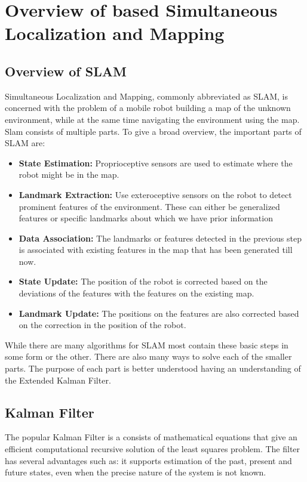\chapter{Overview of \ekf based Simultaneous Localization and Mapping}
\label{cha:Overview}
\section{Overview of SLAM}
\label{sec:SLAM_parts}
Simultaneous Localization and Mapping, commonly abbreviated as SLAM, is concerned with the problem of a mobile robot building a map of the unknown environment, while at the same time navigating the environment using the map. Slam consists of multiple parts. To give a broad overview, the important parts of SLAM are: 
	\begin{itemize}
		\item \textbf{State Estimation:} Proprioceptive sensors are used to estimate where the robot might be in the map.
		\item \textbf{Landmark Extraction:} Use exteroceptive sensors on the robot to detect prominent features of the environment. These can either be generalized features or specific landmarks about which we have prior information 
		\item \textbf{Data Association:} The landmarks or features detected in the previous step is associated with existing features in the map that has been generated till now.  
		\item \textbf{State Update:} The position of the robot is corrected based on the deviations of the features with the features on the existing map. 
		\item \textbf{Landmark Update:} The positions on the features are also corrected based on the correction in the position of the robot. 
	\end{itemize}

While there are many algorithms for SLAM most contain these basic steps in some form or the other. There are also many ways to solve each of the smaller parts. The purpose of each part is better understood having an understanding of the Extended Kalman Filter. 

\section{Kalman Filter}
\label{sec:KalmanFilter}
The popular Kalman Filter \cite{Kalman1960, WelchandBishop1995} is a consists of mathematical equations that give an efficient computational recursive solution of the least squares problem. The filter has several advantages such as: it supports estimation of the past, present and future states, even when the precise nature of the system is not known.

